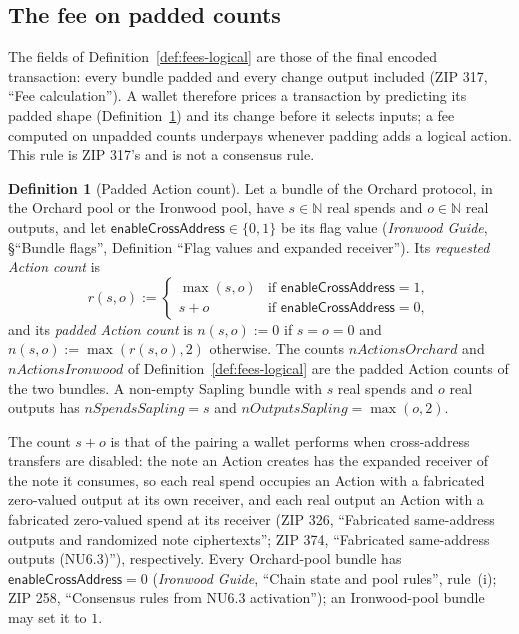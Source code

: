 \documentclass[11pt,a4paper]{article}
\theoremstyle{definition}
\newtheorem{definition}[theorem]{Definition}
\newcommand{\N}{\mathbb{N}}
\begin{document}
\subsection{The fee on padded counts}\label{sec:fees-padded}

The fields of Definition~\ref{def:fees-logical} are those of the final
encoded transaction: every bundle padded and every change output included
(ZIP 317, ``Fee calculation''). A wallet therefore prices a transaction by
predicting its padded shape (Definition~\ref{def:fees-actions}) and its
change before it selects inputs; a fee computed on unpadded counts
underpays whenever padding adds a logical action. This rule is ZIP 317's
and is not a consensus rule.

\begin{definition}[Padded Action count]\label{def:fees-actions}
Let a bundle of the Orchard protocol, in the Orchard pool or the Ironwood
pool, have $s \in \N$ real spends and $o \in \N$ real outputs, and let
$\mathsf{enableCrossAddress} \in \{0, 1\}$ be its flag value
(\emph{Ironwood Guide}, \S``Bundle flags'', Definition ``Flag values and
expanded receiver''). Its \emph{requested Action count} is
\[
  r(s, o) :=
  \begin{cases}
    \max(s, o) & \text{if } \mathsf{enableCrossAddress} = 1, \\
    s + o & \text{if } \mathsf{enableCrossAddress} = 0,
  \end{cases}
\]
and its \emph{padded Action count} is $n(s, o) := 0$ if $s = o = 0$ and
$n(s, o) := \max(r(s, o), 2)$ otherwise. The counts
$\mathit{nActionsOrchard}$ and $\mathit{nActionsIronwood}$ of
Definition~\ref{def:fees-logical} are the padded Action counts of the two
bundles. A non-empty Sapling bundle with $s$ real spends and $o$ real
outputs has $\mathit{nSpendsSapling} = s$ and
$\mathit{nOutputsSapling} = \max(o, 2)$.
\end{definition}

The count $s + o$ is that of the pairing a wallet performs when cross-address
transfers are disabled: the note an Action creates has the expanded receiver of
the note it consumes, so each real spend occupies an Action with a
fabricated zero-valued output at its own receiver, and each real output an
Action with a fabricated zero-valued spend at its receiver (ZIP 326,
``Fabricated same-address outputs and randomized note ciphertexts''; ZIP
374, ``Fabricated same-address outputs (NU6.3)''), respectively. Every
Orchard-pool bundle has $\mathsf{enableCrossAddress} = 0$
(\emph{Ironwood Guide}, ``Chain state and pool rules'', rule~(i); ZIP 258,
``Consensus rules from NU6.3 activation''); an Ironwood-pool bundle may set
it to $1$.
\end{document}

